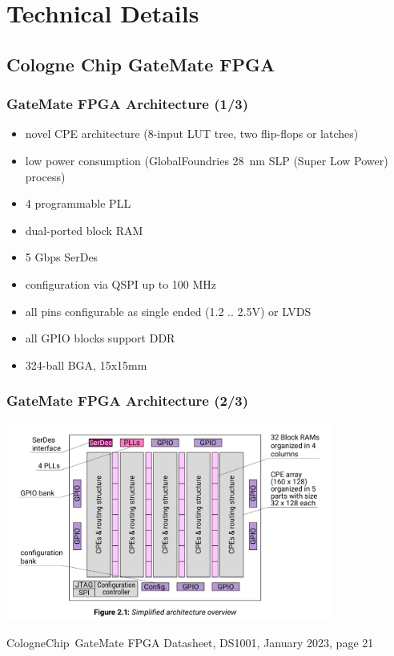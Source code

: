 \section{Technical Details}

\subsection{Cologne Chip GateMate FPGA}

\begin{frame}
  \frametitle{GateMate FPGA Architecture (1/3)}
  \begin{itemize}
  \item novel CPE architecture (8-input LUT tree, two flip-flops or latches)
  \item low power consumption (GlobalFoundries 28~nm SLP (Super Low
  Power) process)
  \item 4 programmable PLL
  \item dual-ported block RAM
  \item 5 Gbps SerDes
  \item configuration via QSPI up to 100 MHz
  \item all pins configurable as single ended (1.2 .. 2.5V) or LVDS
  \item all GPIO blocks support DDR
  \item 324-ball BGA, 15x15mm
  \end{itemize}
\end{frame}

\begin{frame}
  \frametitle{GateMate FPGA Architecture (2/3)}

  \begin{center}
    \includegraphics[height=6.5cm]{Figure_2.1.png}
  \end{center}
  \vspace{-2.5cm}
  \begin{flushright}
  \begin{minipage}{3.7cm}
  \footnotesize{{CologneChip~GateMate} FPGA Datasheet, DS1001, January 2023, page 21}
  \end{minipage}
  \end{flushright}
\end{frame}

